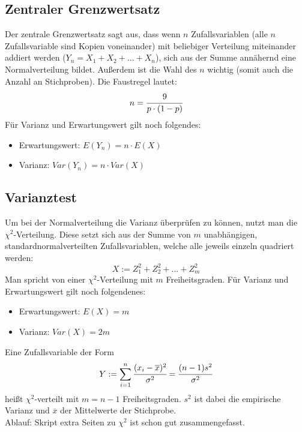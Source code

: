 \documentclass[a4paper]{scrartcl}
\begin{document}
        \subsection{Zentraler Grenzwertsatz}
            Der zentrale Grenzwertsatz sagt aus, dass wenn \(n\) Zufallsvariablen (alle \(n\) Zufallsvariable sind Kopien voneinander) mit beliebiger Verteilung miteinander addiert werden (\(Y_n = X_1 + X_2 + ... + X_n\)),
            sich aus der Summe annähernd eine Normalverteilung bildet. Außerdem ist die Wahl des \(n\) wichtig (somit auch die Anzahl an Stichproben).
            Die Faustregel lautet:
            \begin{equation*}
                n = \cfrac{9}{p \cdot (1- p)}
            \end{equation*} 
            Für Varianz und Erwartungswert gilt noch folgendes:
            \begin{itemize}
                \item Erwartungswert: \(E(Y_n) = n \cdot E(X)\)
                \item Varianz: \(Var(Y_n) = n \cdot Var(X)\)
            \end{itemize} 
        \subsection{Varianztest}
            Um bei der Normalverteilung die Varianz überprüfen zu können, nutzt man die \(\chi^2\)-Verteilung. Diese setzt sich aus der Summe von \(m\) unabhängigen, standardnormalverteilten 
            Zufallsvariablen, welche alle jeweils einzeln quadriert werden:
            \begin{equation}
                X:= Z_1^2 + Z_2^2 + ... + Z_m^2
            \end{equation}
            Man spricht von einer \(\chi^2\)-Verteilung mit \(m\) Freiheitsgraden. Für Varianz und Erwartungswert gilt noch folgendenes:
            \begin{itemize}
                \item Erwartungswert: \(E(X) = m\)
                \item Varianz: \(Var(X) = 2m\)
            \end{itemize}
            Eine Zufallsvariable der Form
            \begin{equation*}
                Y:=\sum\limits_{i=1}^n \cfrac{(x_i - \overline{x})^2}{\sigma^2} = \cfrac{(n-1) s^2}{\sigma^2}
            \end{equation*}
            heißt \(\chi^2\)-verteilt mit \(m = n-1\) Freiheitsgraden. \(s^2\) ist dabei die empirische Varianz und \(\overline{x}\) der Mittelwerte der Stichprobe.\\
            Ablauf: Skript extra Seiten zu \(\chi^2\) ist schon gut zusammengefasst.
\end{document}
